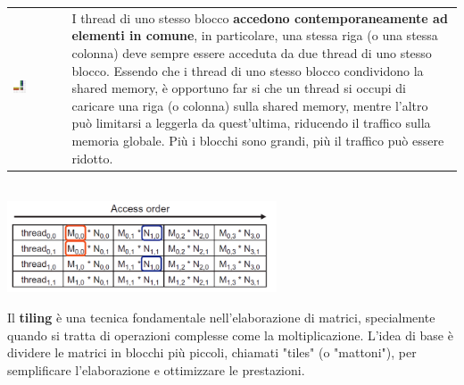 \documentclass[10pt, letterpaper]{report}
\begin{document}
\begin{center}
	\begin{tabular}{>{\centering\arraybackslash}m{3in}>{\arraybackslash}m{3in}}
        \includegraphics[width=0.28\textwidth ]{images/tiling1.png} & I thread di uno stesso blocco \textbf{accedono contemporaneamente ad elementi in comune}, in particolare, una stessa riga (o una stessa colonna) deve sempre essere acceduta da due thread di uno stesso blocco. Essendo che i thread di uno stesso blocco condividono la shared memory, è opportuno far si che un thread si occupi di caricare una riga (o colonna) sulla shared memory, mentre l'altro può limitarsi a leggerla da quest'ultima, riducendo il traffico sulla memoria globale. Più i blocchi sono grandi, più il traffico può essere ridotto.
		\\
	\end{tabular}\\
    \includegraphics[width=0.6\textwidth ]{images/tiling2.png}\end{center}
Il \textbf{tiling} è una tecnica fondamentale nell'elaborazione di matrici, specialmente quando si tratta di operazioni complesse come la moltiplicazione. L'idea di base è dividere le matrici in blocchi più piccoli, chiamati "tiles" (o "mattoni"), per semplificare l'elaborazione e ottimizzare le prestazioni.
\end{document}
